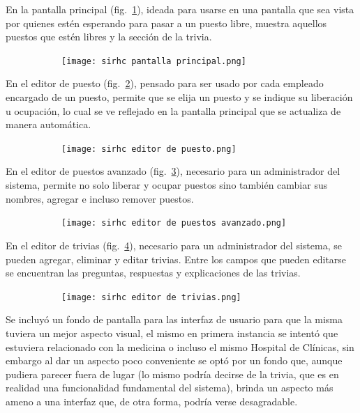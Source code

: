 \documentclass[twoside]{article}
\begin{document}
En la pantalla principal (fig.~\ref{fig:pantallaPrincipal}), ideada para usarse en una pantalla que sea vista por quienes estén esperando para pasar a un puesto libre, muestra aquellos puestos que estén libres y la sección de la trivia.
\begin{figure}[H]
	\caption{Interfaz de la pantalla principal del sistema}
    \begin{subfigure}{1\textwidth}
	\texttt{[image: sirhc pantalla principal.png]}
    \end{subfigure}
	\label{fig:pantallaPrincipal}
\end{figure}
\vspace{-1.0\baselineskip}
En el editor de puesto (fig.~\ref{fig:editorPuesto}), pensado para ser usado por cada empleado encargado de un puesto, permite que se elija un puesto y se indique su liberación u ocupación, lo cual se ve reflejado en la pantalla principal que se actualiza de manera automática.
\begin{figure}[H]
	\caption{Interfaz del editor de puesto}
    \begin{subfigure}{1\textwidth}
	\texttt{[image: sirhc editor de puesto.png]}
    \end{subfigure}
	\label{fig:editorPuesto}
\end{figure}
\vspace{-1.0\baselineskip}
En el editor de puestos avanzado (fig.~\ref{fig:editorPuestosAvanzado}), necesario para un administrador del sistema, permite no solo liberar y ocupar puestos sino también cambiar sus nombres, agregar e incluso remover puestos.
\begin{figure}[H]
	\caption{Interfaz del editor de puestos avanzado}
    \begin{subfigure}{1\textwidth}
	\texttt{[image: sirhc editor de puestos avanzado.png]}
    \end{subfigure}
	\label{fig:editorPuestosAvanzado}
\end{figure}
\vspace{-1.0\baselineskip}
En el editor de trivias (fig.~\ref{fig:editorTrivias}), necesario para un administrador del sistema, se pueden agregar, eliminar y editar trivias. Entre los campos que pueden editarse se encuentran las preguntas, respuestas y explicaciones de las trivias.
\begin{figure}[H]
	\caption{Interfaz del editor de trivias}
    \begin{subfigure}{1\textwidth}
	\texttt{[image: sirhc editor de trivias.png]}
    \end{subfigure}
	\label{fig:editorTrivias}
\end{figure}
\vspace{-1.0\baselineskip}
Se incluyó un fondo de pantalla para las interfaz de usuario para que la misma tuviera un mejor aspecto visual, el mismo en primera instancia se intentó que estuviera relacionado con la medicina o incluso el mismo Hospital de Clínicas, sin embargo al dar un aspecto poco conveniente se optó por un fondo que, aunque pudiera parecer fuera de lugar (lo mismo podría decirse de la trivia, que es en realidad una funcionalidad fundamental del sistema), brinda un aspecto más ameno a una interfaz que, de otra forma, podría verse desagradable.
\end{document}
